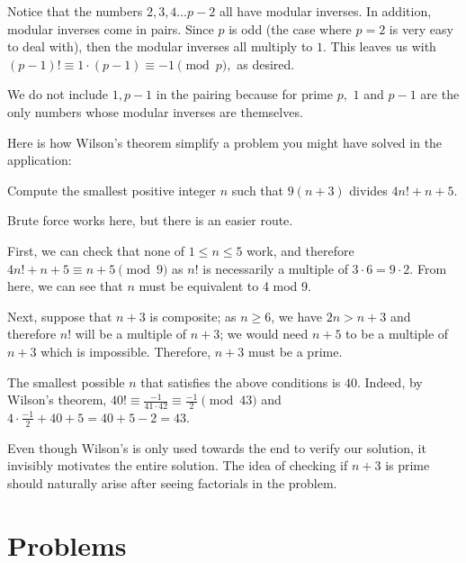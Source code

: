 \documentclass[mast]{lucky}
\begin{document}
\begin{pro}[1]
Notice that the numbers $2,3,4\dots p-2$ all have modular inverses. In addition, modular inverses come in pairs. Since $p$ is odd (the case where $p=2$ is very easy to deal with), then the modular inverses all multiply to $1.$ This leaves us with $(p-1)!\equiv 1\cdot (p-1)\equiv -1\pmod{p},$ as desired.
\end{pro}

We do not include $1,p-1$ in the pairing because for prime $p,$ $1$ and $p-1$ are the only numbers whose modular inverses are themselves.

Here is how Wilson's theorem simplify a problem you might have solved in the application:

\begin{exam}
Compute the smallest positive integer $n$ such that $9(n+3)$ divides $4n!+n+5$.
\end{exam}

\begin{sol}
Brute force works here, but there is an easier route.

First, we can check that none of $1\le n\le 5$ work, and therefore $4n!+n+5\equiv n+5\pmod{9}$ as $n!$ is necessarily a multiple of $3\cdot 6=9\cdot 2$. From here, we can see that $n$ must be equivalent to 4 mod 9.

Next, suppose that $n+3$ is composite; as $n\ge 6$, we have $2n>n+3$ and therefore $n!$ will be a multiple of $n+3$; we would need $n+5$ to be a multiple of $n+3$ which is impossible. Therefore, $n+3$ must be a prime.

The smallest possible $n$ that satisfies the above conditions is $40$. Indeed, by Wilson's theorem, $40!\equiv \frac{-1}{41\cdot 42} \equiv \frac{-1}{2}\pmod{43}$ and $4\cdot \frac{-1}{2}+40+5=40+5-2=43$.
\end{sol}

\begin{remark}
Even though Wilson's is only used towards the end to verify our solution, it invisibly motivates the entire solution. The idea of checking if $n+3$ is prime should naturally arise after seeing factorials in the problem.
\end{remark}
\pagebreak

\section{Problems}

\end{document}
